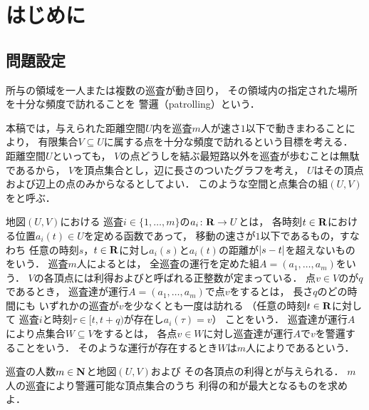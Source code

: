 \chapter{はじめに}
\label{chapter: introduction}

\section{問題設定}
\label{section: problemDefinition}
所与の領域を一人または複数の巡査が動き回り，
その領域内の指定された場所を十分な頻度で訪れることを
警邏（patrolling）という\cite{
  Dumitrescu:2014:CGC:2636805.2636822,
  chen2013fence,
  coene2011charlemagne,
  czyzowicz2011boundary}．

本稿では，与えられた距離空間$U$内を巡査$m$人が速さ$1$以下で動きまわることにより，
有限集合$V \subseteq U$に属する点を十分な頻度で訪れるという目標を考える．
距離空間$U$といっても，
$V$の点どうしを結ぶ最短路以外を巡査が歩むことは無駄であるから，
$V$を頂点集合とし，辺に長さのついたグラフを考え，
$U$はその頂点および辺上の点のみからなるとしてよい．
このような空間と点集合の組$(U, V)$をと呼ぶ．

地図$(U, V)$における
巡査$i \in \{1, \ldots, m\}$の$a _i \colon \mathbf R \to U$とは，
各時刻$t \in \mathbf R$における位置$a _i (t) \in U$を定める函数であって，
移動の速さが$1$以下であるもの，すなわち
任意の時刻$s$，$t \in \mathbf R$に対し$a _i (s)$と$a _i (t)$の距離が$\lvert{s - t}\rvert$を超えないものをいう．
巡査$m$人によるとは，
全巡査の運行を定めた組$A = (a _1, \dots, a _m)$をいう．
$V$の各頂点には利得および{\maxIdletime}と呼ばれる正整数が定まっている．
点$v \in V$の{\maxIdletime}が$q$であるとき，
巡査達が運行$A = (a _1, \dots, a _m)$で点$v$をするとは，
長さ$q$のどの時間にも
いずれかの巡査が$v$を少なくとも一度は訪れる
（任意の時刻$t \in \mathbf R$に対して
巡査$i$と時刻$\tau \in [t, t + q)$が存在し$a _i (\tau) = v$）
ことをいう．
巡査達が運行$A$により点集合$W \subseteq V$をするとは，
各点$v \in W$に対し巡査達が運行$A$で$v$を警邏することをいう．
そのような運行が存在するとき$W$は$m$人によりであるという．

\begin{patrollingProblem}
  巡査の人数$m \in \mathbf N$と地図$(U, V)$および
  その各頂点の利得と{\maxIdletime}が与えられる．
  $m$人の巡査により警邏可能な頂点集合のうち
  利得の和が最大となるものを求めよ．
\end{patrollingProblem}

